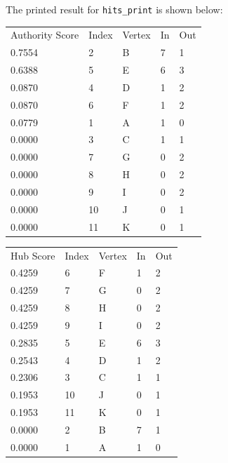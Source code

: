 \documentclass[12pt, titlepage, twoside]{amsart}
\begin{document}
The printed result for \texttt{hits_print} is shown below:

\begin{table}[h]
\begin{tabular}{lllll}
Authority Score & Index & Vertex & In & Out\\
    0.7554 &         2 &         B& 7 &         1 \\
    0.6388 &         5 &         E & 6 &         3 \\
    0.0870 &         4 &         D & 1 &         2 \\
    0.0870 &         6 &         F & 1 &         2 \\
    0.0779 &         1 &         A & 1 &         0 \\
    0.0000 &         3 &         C & 1 &         1 \\
    0.0000 &         7 &         G & 0 &         2 \\
    0.0000 &         8 &         H & 0 &         2 \\
    0.0000 &         9 &         I & 0 &         2 \\
    0.0000 &        10 &        J & 0 &         1 \\
    0.0000 &        11 &        K & 0 &         1 \\
\end{tabular}
\end{table}

\begin{table}[h]
\begin{tabular}{lllll}
Hub Score & Index & Vertex & In & Out\\
    0.4259 &         6 &        F & 1 &         2 \\
    0.4259 &         7 &        G & 0 &         2 \\
    0.4259 &         8 &        H & 0 &         2 \\
    0.4259 &         9 &        I & 0 &         2 \\
    0.2835 &         5 &        E & 6 &         3 \\
    0.2543 &         4 &        D & 1 &         2 \\
    0.2306 &         3 &        C & 1 &         1 \\
    0.1953 &        10 &       J & 0 &         1 \\
    0.1953 &        11 &       K & 0 &         1 \\
    0.0000 &         2 &        B & 7 &         1 \\
    0.0000 &         1 &        A & 1 &         0 \\
\end{tabular}
\end{table}
\end{document}
